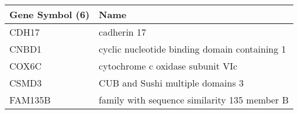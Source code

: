 \begin{tabular}{ll}
\toprule
Gene Symbol (6) &                                          Name \\
\midrule
          CDH17 &                                   cadherin 17 \\
          CNBD1 & cyclic nucleotide binding domain containing 1 \\
          COX6C &              cytochrome c oxidase subunit VIc \\
          CSMD3 &              CUB and Sushi multiple domains 3 \\
        FAM135B &  family with sequence similarity 135 member B \\
\bottomrule
\end{tabular}
